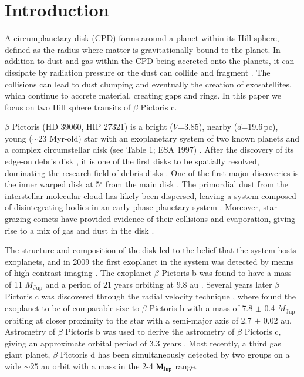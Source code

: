 \documentclass{aa}
\newcommand\picb{$\beta$ Pictoris b}
\newcommand\picc{$\beta$ Pictoris c}
\newcommand\picd{$\beta$ Pictoris d}
\newcommand\pic{$\beta$ Pictoris}
\begin{document}
 
\maketitle
\section{Introduction}
A circumplanetary disk (CPD) forms around a planet \citep{Taylor_2024} within its Hill sphere, defined as the radius where matter is gravitationally bound to the planet. 
%
In addition to dust and gas within the CPD being accreted onto the planets, it can dissipate by radiation pressure or the dust can collide and fragment \citep{Oberg_2020}.
%
The collisions can lead to dust clumping and eventually the creation of exosatellites, which continue to accrete material, creating gaps and rings.
%
In this paper we focus on two Hill sphere transits of \picc{}.

\pic{} (HD 39060, HIP 27321) is a bright ($V$=3.85), nearby ($d$=19.6\,pc), young ($\sim$23 Myr-old) star with an exoplanetary system of two known planets and a complex circumstellar disk (see Table 1; ESA 1997)  \citep{GaiaCollab23,Mamajek14,Smith_1984,Lagrange_2010}.
%
After the discovery of its edge-on debris disk \citep{Smith_1984}, it is one of the first disks to be spatially resolved, dominating the research field of debris disks \citep{Artymowicz_1997}.
%
One of the first major discoveries is the inner warped disk at 5$^\circ$ from the main disk \citep{Golimowski_2006}.
%
The primordial dust from the interstellar molecular cloud has likely been dispersed, leaving a system composed of disintegrating bodies in an early-phase planetary system \citep[e.g.][]{Backman_1993,Artymowicz_1997,Lagrange_2000,Zuckerman_2001}.
%
Moreover, star-grazing comets have provided evidence of their collisions and evaporation, giving rise to a mix of gas and dust in the disk \citep[e.g.][and references therein]{Lagrange_1998,Beust_1990,Lecavelier_Des_Etangs_1995,Beust_1996,Vidal_Madjar_2017}. 

The structure and composition of the disk led to the belief that the system hosts exoplanets, and in 2009 the first exoplanet in the system was detected by means of high-contrast imaging  \citep{Lagrange_2009}. 
%
The exoplanet \picb{} was found to have a mass of 11 $M_{\text{Jup}}$ and a period of 21 years orbiting at 9.8 au  \citep[e.g.][and many more]{Lagrange_2010, Chauvin_2012,Wang_2016,Snellen_2018,Kenworthy_2021}. 
%
Several years later \picc{} was discovered through the radial velocity technique  \citep{Lagrange_2019,Lagrange_2020,Nowak_2020}, where \citet{Lagrange_2020} found the exoplanet to be of comparable size to \picb{} with a mass of 7.8 $\pm$ 0.4 $M_{\text{Jup}}$ orbiting at closer proximity to the star with a semi-major axis of 2.7 $\pm$ 0.02 au. 
%
Astrometry of \picb{} was used to derive the astrometry of \picc{}, giving an approximate orbital period of 3.3 years \citep{Lacour_2021}. 
%
Most recently, a third gas giant planet, \picd{} has been simultaneously detected by two groups \citep{2026arXiv260623801S,2026arXiv260623789G} on a wide $\sim 25$ au orbit with a mass in the 2-4 ${\rm M_{Jup}}$ range.
\end{document}
